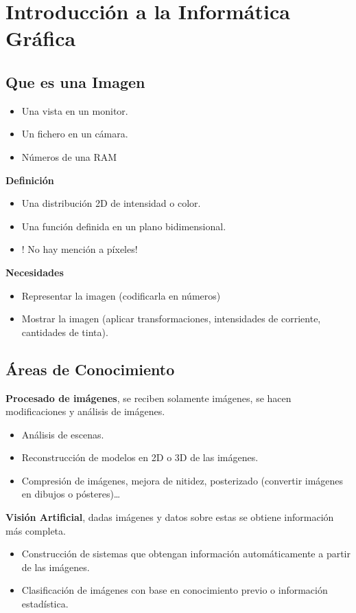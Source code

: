 \chapter{Introducción a la Informática Gráfica}\label{ch:introduccion-a-la-informática-gráfica}
\section{Que es una Imagen}\label{sec:que-es-una-imagen}
\begin{itemize}
	\item Una vista en un monitor.
	\item Un fichero en un cámara.
	\item Números de una RAM
\end{itemize}
\textbf{Definición}
\begin{itemize}
	\item Una distribución 2D de intensidad o color.
	\item Una función definida en un plano bidimensional.
	\item ! No hay mención a píxeles!
\end{itemize}
\textbf{Necesidades}
\begin{itemize}
	\item Representar la imagen (codificarla en números)
	\item Mostrar la imagen (aplicar transformaciones, intensidades de corriente, cantidades de tinta).
\end{itemize}

\section{Áreas de Conocimiento}\label{sec:áreas-de-conocimiento}
\textbf{Procesado de imágenes}, se reciben solamente imágenes, se hacen modificaciones y análisis de imágenes.
\begin{itemize}
	\item Análisis de escenas.
	\item Reconstrucción de modelos en 2D o 3D de las imágenes.
	\item Compresión de imágenes, mejora de nitidez, posterizado (convertir imágenes en dibujos o pósteres)\ldots
\end{itemize}

\textbf{Visión Artificial}, dadas imágenes y datos sobre estas se obtiene información más completa.
\begin{itemize}
	\item Construcción de sistemas que obtengan información automáticamente a partir de las imágenes.
	\item Clasificación de imágenes con base en conocimiento previo o información estadística.
\end{itemize}

